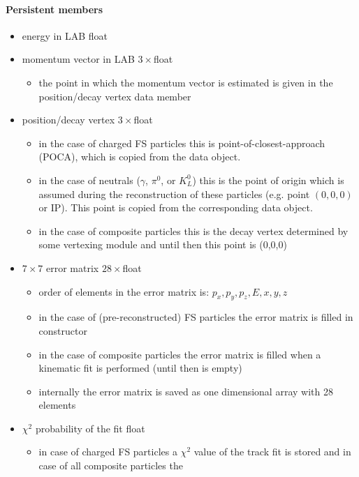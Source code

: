\paragraph{Persistent members} 
\begin{itemize}
 \item {\color{blue}energy in LAB} \hfill{float}
 \item {\color{blue}momentum vector in LAB} \hfill{$3\times$float}
 \begin{itemize}
  \item the point in which the momentum vector is estimated is given in the position/decay vertex data member
 \end{itemize}
 \item {\color{blue}position/decay vertex} \hfill{$3\times$float}
 \begin{itemize}
  \item in the case of charged FS particles this is point-of-closest-approach (POCA), which is copied from the \track data object.
  \item in the case of neutrals ($\gamma$, $\pi^0$, or $K^0_L$) this is the point of origin which is assumed during the 
  reconstruction of these particles (e.g. point $(0,0,0)$ or IP). This point is  copied from the corresponding \mdst data object. 
  \item in the case of composite particles this is the decay vertex determined by some vertexing module and until then this point is (0,0,0)
 \end{itemize}
 \item {\color{blue}$7\times7$ error matrix} \hfill{$28\times$float}
 \begin{itemize}
  \item order of elements in the error matrix is: $p_x, p_y, p_z, E, x, y, z$
  \item in the case of (pre-reconstructed) FS particles the error matrix is filled in \particle constructor
  \item in the case of composite particles the error matrix is filled when a kinematic fit is performed (until then is empty)
  \item internally the error matrix is saved as one dimensional array with 28 elements 
 \end{itemize}
 \item {\color{blue}$\chi^2$ probability of the fit} \hfill{float}
 \begin{itemize}
  \item in case of charged FS particles a $\chi^2$ value of the track fit is stored and in case of all composite particles the 

\end{itemize}
\end{itemize}
